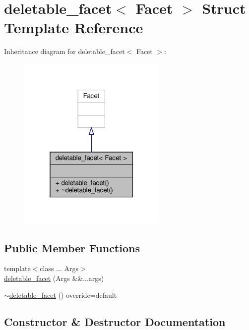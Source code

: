 \hypertarget{structdeletable__facet}{}\section{deletable\+\_\+facet$<$ Facet $>$ Struct Template Reference}
\label{structdeletable__facet}


Inheritance diagram for deletable\+\_\+facet$<$ Facet $>$\+:
\nopagebreak
\begin{figure}[H]
\begin{center}
\leavevmode
\includegraphics[width=205pt]{structdeletable__facet__inherit__graph}
\end{center}
\end{figure}
\subsection*{Public Member Functions}
\begin{DoxyCompactItemize}
\item 
{\footnotesize template$<$class ... Args$>$ }\\\hyperlink{structdeletable__facet_aad9b2bab1462589baf93408da989036a}{deletable\+\_\+facet} (Args \&\&...args)
\item 
\hyperlink{structdeletable__facet_a9a87be8442c76d1035d3489913789b71}{$\sim$deletable\+\_\+facet} () override=default
\end{DoxyCompactItemize}


\subsection{Constructor \& Destructor Documentation}
\mbox{\label{structdeletable__facet_aad9b2bab1462589baf93408da989036a}} 
